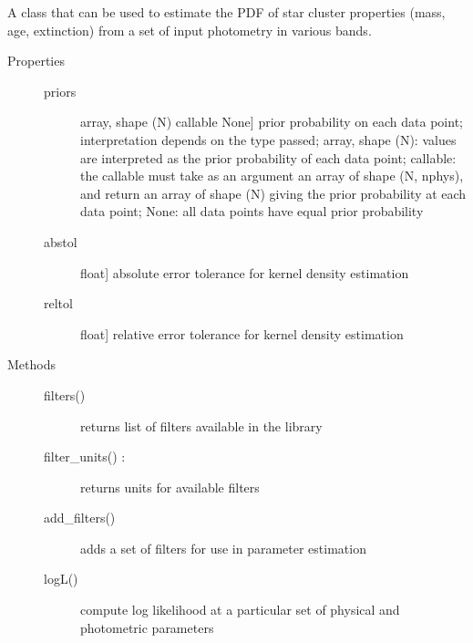 \documentclass[letterpaper,10pt,english]{sphinxmanual}
\begin{document}
\begin{fulllineitems}
\label{cluster_slug:slugpy.cluster_slug.cluster_slug}
A class that can be used to estimate the PDF of star cluster
properties (mass, age, extinction) from a set of input photometry
in various bands.
\begin{description}
\item[{Properties}] \leavevmode\begin{description}
\item[{priors}] \leavevmode{[}array, shape (N) \textbar{} callable \textbar{} None{]}
prior probability on each data point; interpretation
depends on the type passed; array, shape (N): values are
interpreted as the prior probability of each data point;
callable: the callable must take as an argument an array
of shape (N, nphys), and return an array of shape (N)
giving the prior probability at each data point; None:
all data points have equal prior probability

\item[{abstol}] \leavevmode{[}float{]}
absolute error tolerance for kernel density estimation

\item[{reltol}] \leavevmode{[}float{]}
relative error tolerance for kernel density estimation

\end{description}

\item[{Methods}] \leavevmode\begin{description}
\item[{filters()}] \leavevmode{[}{]}
returns list of filters available in the library

\item[{filter\_units() :}] \leavevmode
returns units for available filters

\item[{add\_filters()}] \leavevmode{[}{]}
adds a set of filters for use in parameter estimation

\item[{logL()}] \leavevmode{[}{]}
compute log likelihood at a particular set of physical and
photometric parameters


\end{description}
\end{description}
\end{fulllineitems}
\end{document}
